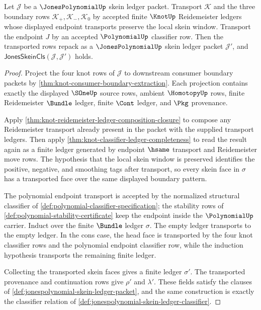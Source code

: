 \begin{lemma}
\label{lem:jonespolynomial-skein-ledger-reidemeister-transport}
Let $\mathcal{J}$ be a $\JonesPolynomialUp$ skein ledger packet. Transport
$\mathcal{K}$ and the three boundary rows
$\mathcal{K}_+,\mathcal{K}_-,\mathcal{K}_0$ by accepted finite $\KnotUp$
Reidemeister ledgers whose displayed endpoint transports preserve the local
skein window. Transport the endpoint $J$ by an accepted $\PolynomialUp$
classifier row. Then the transported rows repack as a $\JonesPolynomialUp$
skein ledger packet $\mathcal{J}'$, and
$\mathsf{JonesSkeinCls}(\mathcal{J},\mathcal{J}')$ holds.
\end{lemma}
\begin{proof}
Project the four knot rows of $\mathcal{J}$ to downstream consumer boundary
packets by \autoref{thm:knot-consumer-boundary-extraction}. Each projection
contains exactly the displayed $\SOneUp$ source rows, ambient $\HomotopyUp$
rows, finite Reidemeister $\Bundle$ ledger, finite $\Cont$ ledger, and
$\Pkg$ provenance.

Apply \autoref{thm:knot-reidemeister-ledger-composition-closure} to compose
any Reidemeister transport already present in the packet with the supplied
transport ledgers. Then apply \autoref{thm:knot-classifier-ledger-completeness}
to read the result again as a finite ledger generated by endpoint $\hsame$
transport and Reidemeister move rows. The hypothesis that the local skein
window is preserved identifies the positive, negative, and smoothing tags after
transport, so every skein face in $\sigma$ has a transported face over the
same displayed boundary pattern.

The polynomial endpoint transport is accepted by the normalized structural
classifier of \autoref{def:polynomial-classifier-specification}; the stability
rows of \autoref{def:polynomial-stability-certificate} keep the endpoint
inside the $\PolynomialUp$ carrier. Induct over the finite $\Bundle$ ledger
$\sigma$. The empty ledger transports to the empty ledger. In the cons case,
the head face is transported by the four knot classifier rows and the
polynomial endpoint classifier row, while the induction hypothesis transports
the remaining finite ledger.

Collecting the transported skein faces gives a finite ledger $\sigma'$. The
transported provenance and continuation rows give $\rho'$ and $\lambda'$.
These fields satisfy the clauses of
\autoref{def:jonespolynomial-skein-ledger-packet}, and the same construction
is exactly the classifier relation of
\autoref{def:jonespolynomial-skein-ledger-classifier}.
\end{proof}


